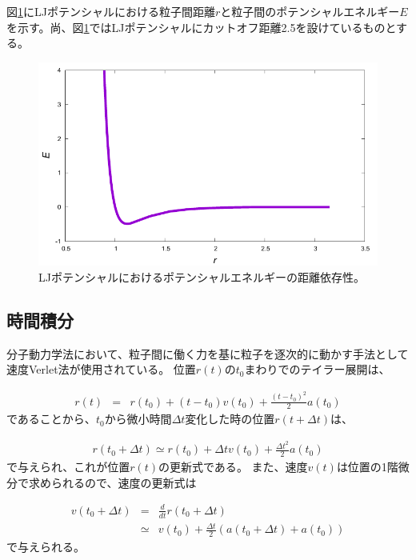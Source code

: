 \documentclass[titlepage]{jsreport}
\begin{document}
図\ref{fig:dis-poen}にLJポテンシャルにおける粒子間距離$r$と粒子間のポテンシャルエネルギー$E$を示す。尚、図\ref{fig:dis-poen}ではLJポテンシャルにカットオフ距離2.5を設けているものとする。

\begin{figure}[htbp]
    \begin{center}
        \includegraphics[width=14cm]{fig/dis-poen/dis-poen.pdf}
    \end{center}
    \caption{LJポテンシャルにおけるポテンシャルエネルギーの距離依存性。}
    \label{fig:dis-poen}
\end{figure}


\subsection{時間積分}\label{principle-subsec:time-integral}
分子動力学法において、粒子間に働く力を基に粒子を逐次的に動かす手法として速度Verlet法が使用されている。
位置$r(t)$の$t_0$まわりでのテイラー展開は、

\large
\begin{eqnarray}
r(t) &=& r(t_0)+(t-t_0)v(t_0)+\frac{(t-t_0)^2}{2}a(t_0) \label{eq:taylor}
\end{eqnarray}
\normalsize
であることから、$t_0$から微小時間$\Delta{t}$変化した時の位置$r(t+\Delta{t})$は、

\large
\begin{eqnarray}
r(t_0+\Delta{t}) \simeq r(t_0)+\Delta{t}v(t_0)+\frac{\Delta{t}^2}{2}a(t_0) \label{eq:r-renewal-formula}
\end{eqnarray}
\normalsize
で与えられ、これが位置$r(t)$の更新式である\cite{velocity-verlet}。
また、速度$v(t)$は位置の1階微分で求められるので、速度の更新式は

\large
\begin{eqnarray}
v(t_0+\Delta{t}) &=& \frac{d}{dt}r(t_0+\Delta{t}) \nonumber \\
&\simeq& v(t_0)+\frac{\Delta{t}}{2}(a(t_0+\Delta{t})+a(t_0)) \label{eq:v-renewal-formula}
\end{eqnarray}
\normalsize
で与えられる。
\end{document}
